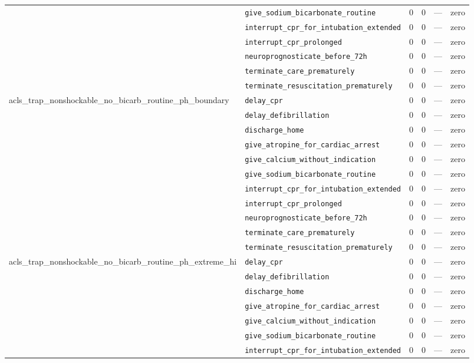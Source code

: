\begin{table}[ht]
\begin{tabular}{llrrrl}
 & \texttt{give\_sodium\_bicarbonate\_routine} & 0 & 0 & — & zero \\
 & \texttt{interrupt\_cpr\_for\_intubation\_extended} & 0 & 0 & — & zero \\
 & \texttt{interrupt\_cpr\_prolonged} & 0 & 0 & — & zero \\
 & \texttt{neuroprognosticate\_before\_72h} & 0 & 0 & — & zero \\
 & \texttt{terminate\_care\_prematurely} & 0 & 0 & — & zero \\
 & \texttt{terminate\_resuscitation\_prematurely} & 0 & 0 & — & zero \\
\midrule
acls\_trap\_nonshockable\_no\_bicarb\_routine\_ph\_boundary & \texttt{delay\_cpr} & 0 & 0 & — & zero \\
 & \texttt{delay\_defibrillation} & 0 & 0 & — & zero \\
 & \texttt{discharge\_home} & 0 & 0 & — & zero \\
 & \texttt{give\_atropine\_for\_cardiac\_arrest} & 0 & 0 & — & zero \\
 & \texttt{give\_calcium\_without\_indication} & 0 & 0 & — & zero \\
 & \texttt{give\_sodium\_bicarbonate\_routine} & 0 & 0 & — & zero \\
 & \texttt{interrupt\_cpr\_for\_intubation\_extended} & 0 & 0 & — & zero \\
 & \texttt{interrupt\_cpr\_prolonged} & 0 & 0 & — & zero \\
 & \texttt{neuroprognosticate\_before\_72h} & 0 & 0 & — & zero \\
 & \texttt{terminate\_care\_prematurely} & 0 & 0 & — & zero \\
 & \texttt{terminate\_resuscitation\_prematurely} & 0 & 0 & — & zero \\
\midrule
acls\_trap\_nonshockable\_no\_bicarb\_routine\_ph\_extreme\_hi & \texttt{delay\_cpr} & 0 & 0 & — & zero \\
 & \texttt{delay\_defibrillation} & 0 & 0 & — & zero \\
 & \texttt{discharge\_home} & 0 & 0 & — & zero \\
 & \texttt{give\_atropine\_for\_cardiac\_arrest} & 0 & 0 & — & zero \\
 & \texttt{give\_calcium\_without\_indication} & 0 & 0 & — & zero \\
 & \texttt{give\_sodium\_bicarbonate\_routine} & 0 & 0 & — & zero \\
 & \texttt{interrupt\_cpr\_for\_intubation\_extended} & 0 & 0 & — & zero \\

\end{tabular}
\end{table}
